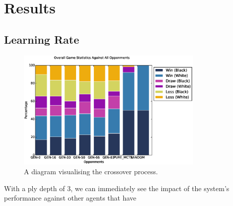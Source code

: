 \documentclass[12pt,a4paper]{article}
\begin{document}
    
\section{Results}
    
    
    \subsection{Learning Rate}
    \begin{figure}[!h]
                \centering
                \includegraphics[width=90mm]{images/results/3ply/gm_net_stats.eps}
                \caption{A diagram visualising the crossover process.\label{crossoverpic}}
            \end{figure}
    With a ply depth of 3, we can immediately see the impact of the system's performance against other agents that have 
\end{document}

